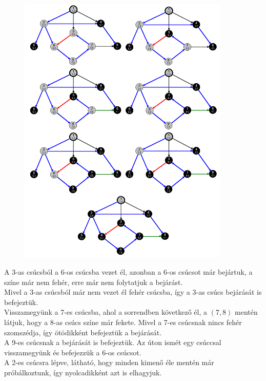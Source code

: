 \documentclass[margin=0px]{article}
\begin{document}
	\begin{figure}[H]
		\centering
		\includegraphics[width=0.9\textwidth]{img/melysegi_3.png}
		\label{fig:melysegi_pelda_3}
	\end{figure}

    \noindent A 3-as csúcsból a 6-os csúcsba vezet él, azonban a 6-os csúcsot már bejártuk, a színe már nem fehér, erre már nem folytatjuk a bejárást. \\
    Mivel a 3-as csúcsból már nem vezet él fehér csúcsba, így a 3-as csúcs bejárását is befejeztük.\\
    Visszamegyünk a 7-es csúcsba, ahol a sorrendben következő él, a $(7,8)$ mentén látjuk, hogy a 8-as csúcs színe már fekete. Mivel a 7-es csúcsnak nincs fehér szomszédja, így ötödikként befejeztük a bejárását.\\
    A 9-es csúcsnak a bejárását is befejeztük. Az úton ismét egy csúccsal visszamegyünk és befejezzük a 6-os csúcsot.\\
    A 2-es csúcsra lépve, látható, hogy minden kimenő éle mentén már próbálkoztunk, így nyolcadikként azt is elhagyjuk.
\end{document}
